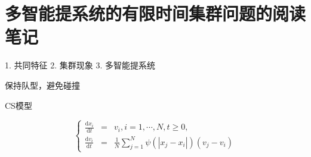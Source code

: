 
\section{多智能提系统的有限时间集群问题的阅读笔记}

1. 共同特征
2. 集群现象
3. 多智能提系统

保持队型，避免碰撞

CS模型

\begin{equation}
    \left\{\begin{matrix} 
        \frac{\mathrm{d} x_i}{\mathrm{d} t}&=&v_i, i=1, \cdots ,N, t\ge 0, \\  
        \frac{\mathrm{d} v_i}{\mathrm{d} t}&=&\frac{1}{N} \sum\nolimits_{j=1}^{N} \psi \left ( \left | x_j-x_i \right |  \right ) \left ( v_j-v_i \right )    
      \end{matrix}\right. 
\end{equation}




